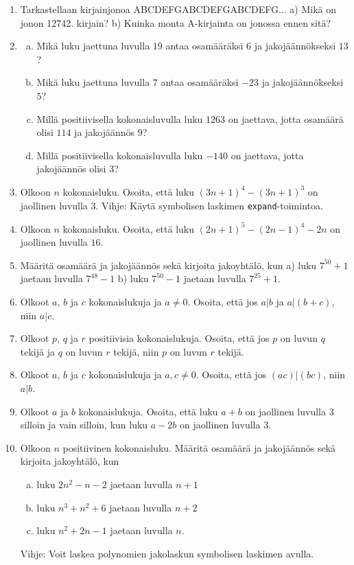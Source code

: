 \begin{enumerate}
\item Tarkastellaan kirjainjonoa ABCDEFGABCDEFGABCDEFG... a) Mikä on jonon 12742. kirjain? b) Kuinka monta A-kirjainta on jonossa ennen sitä?

\item 
\begin{enumerate}[a)]
\item Mikä luku jaettuna luvulla $19$ antaa osamääräksi $6$ ja jakojäännökseksi $13$?
\item Mikä luku jaettuna luvulla $7$ antaa osamääräksi $-23$ ja jakojäännökseksi $5$?
\item Millä positiivisella kokonaisluvulla luku $1263$ on jaettava, jotta osamäärä olisi $114$ ja jakojäännös $9$?
\item  Millä positiivisella kokonaisluvulla luku $-140$ on jaettava, jotta jakojäännös olisi $3$?
\end{enumerate}

\item Olkoon $n$ kokonaisluku. Osoita, että luku $(3n+1)^4 - (3n+1)^3$ on jaollinen luvulla 3. Vihje: Käytä symbolisen laskimen {\tt expand}-toimintoa.

\item Olkoon $n$ kokonaisluku. Osoita, että luku $(2n+1)^5 - (2n-1)^4-2n$ on jaollinen luvulla $16$.

\item Määritä osamäärä ja jakojäännös sekä kirjoita jakoyhtälö, kun a) luku $7^{50} + 1$ jaetaan luvulla $7^{48} - 1$ b) luku $7^{50} - 1$ jaetaan luvulla $7^{25} + 1$.

\item Olkoot $a$, $b$ ja $c$ kokonaislukuja ja $a \neq 0$. Osoita, että jos $a|b$ ja $a|(b + c)$, niin $a|c$.

\item Olkoot $p$, $q$ ja $r$ positiivisia kokonaislukuja. Osoita, että jos $p$ on luvun $q$ tekijä ja $q$ on luvun $r$ tekijä, niin $p$ on luvun $r$ tekijä.

\item Olkoot $a$, $b$ ja $c$ kokonaislukuja ja $a, c \neq 0$. Osoita, että jos $(ac)|(bc)$, niin $a|b$.

\item Olkoot $a$ ja $b$ kokonaislukuja. Osoita, että luku $a + b$ on jaollinen luvulla $3$ silloin ja vain silloin, kun luku $a - 2b$ on jaollinen luvulla $3$.

\item Olkoon $n$ positiivinen kokonaisluku. Määritä osamäärä ja jakojäännös sekä kirjoita jakoyhtälö, kun
\begin{enumerate}[a)]
\item luku $2n^2 - n - 2$ jaetaan luvulla $n + 1$
\item luku $n^3 + n^2 + 6$ jaetaan luvulla $n + 2$
\item luku $n^2 + 2n - 1$ jaetaan luvulla $n$.
\end{enumerate}
Vihje: Voit laskea polynomien jakolaskun symbolisen laskimen avulla.


\end{enumerate}
